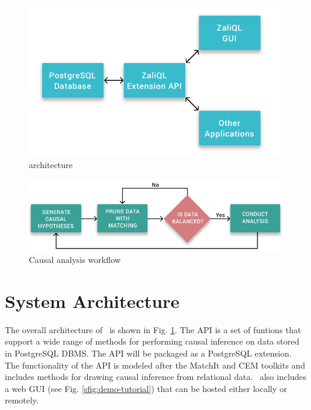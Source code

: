 
\begin{figure}
 \includegraphics[scale=0.25]{Figures/System-Overview.png}
  \vspace{-3.3mm} \caption{\GSQLB architecture}

  \label{fig:arch}
  \vspace{-3mm}
\end{figure}


\begin{figure}
  \includegraphics[scale=0.25]{Figures/Matching-Flowchart.png}
  \vspace{-3mm}\caption{Causal analysis workflow}

\label{fig:flowchart}
\vspace{-0.3cm}
\end{figure}



\section{System Architecture}

The overall architecture of \GSQL\ is shown in Fig. \ref{fig:arch}.
The API is a set of funtions that support a wide
range of methods for performing causal inference on data stored in PostgreSQL DBMS. %
The API will be packaged as a PostgreSQL extension. %
The functionality of the API is modeled after the MatchIt and CEM toolkits 
\cite{ho2005,iacus2009cem} and includes methods for drawing causal inference from relational data. \GSQL\ also includes a web GUI
(see Fig. \ref{sfig:demo-tutorial}) that can be hosted either locally or
remotely. %

